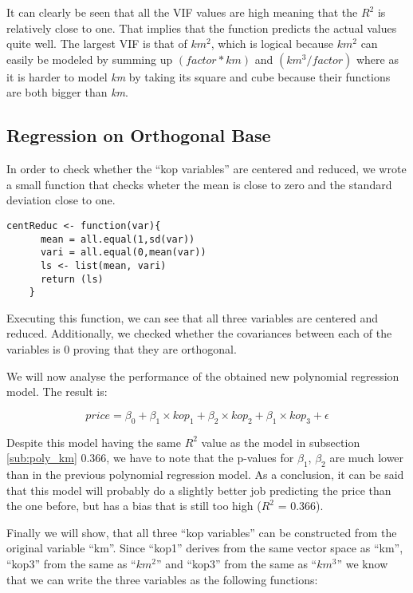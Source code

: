 \noindent
It can clearly be seen that all the VIF values are high meaning that the $R^2$ is relatively close to one. That implies that the function predicts the actual values quite well. The largest VIF is that of $km^2$, which is logical because $km^2$ can easily be modeled by summing up  $(factor * km)$ and $(km^3 / factor)$ where as it is harder to model \textit{km} by taking its square and cube because their functions are both bigger than \textit{km}.


\subsection{Regression on Orthogonal Base} %
\label{sub:regression_on_orthogonal_base}

In order to check whether the ``kop variables'' are centered and reduced, 
we wrote a small function that checks wheter the mean is close to zero and 
the standard deviation close to one. 

\begin{lstlisting}[caption={check center and scale funcion in R},label={lst:cent_func}]
	centReduc <- function(var){
	  mean = all.equal(1,sd(var))
	  vari = all.equal(0,mean(var))
	  ls <- list(mean, vari)
	  return (ls)
	}
\end{lstlisting}

Executing this function, we can see that all three variables are centered and reduced. Additionally, we checked whether the covariances between each of the variables is 0 proving that they are orthogonal.

We will now analyse the performance of the obtained new polynomial 
regression model. The result is: 

\begin{equation}\label{eq:price_km_poly}
	price = \beta_0 + \beta_1 \times kop_1 + \beta_2 \times kop_2 + \beta_1 \times kop_3 
	+ \epsilon
\end{equation}

Despite this model having the same $R^2$ value as the model in subsection 
\ref{sub:poly_km} 0.366, we have to note that the p-values for $\beta_1$, $\beta_2$ are much lower than in the previous polynomial regression model.
As a conclusion, it can be said that this model will probably do a slightly better job predicting the price than the one before, but has a bias that is still too high ($R^2$ = 0.366).

Finally we will show, that all three ``kop variables'' can be constructed 
from the original variable ``km''. Since ``kop1'' derives from the same vector space as ``km'', ``kop3'' from the same as ``$km^2$'' and ``kop3'' from the same as ``$km^3$'' we know that we can write the three variables as the following functions:

